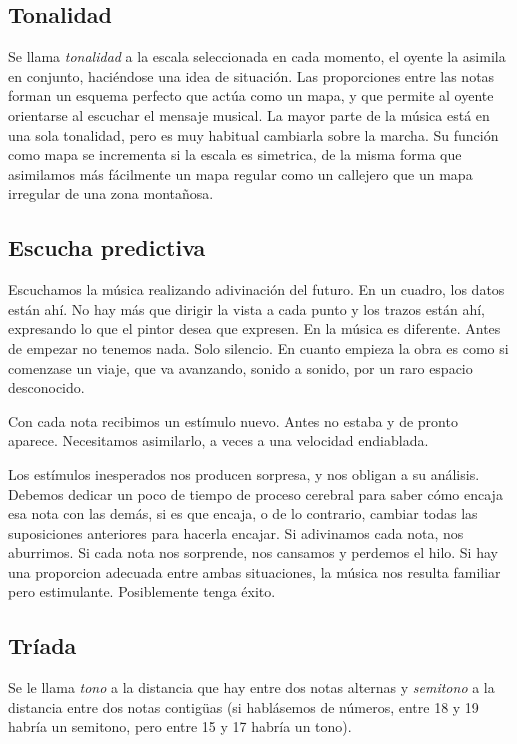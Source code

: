 \documentclass[]{report}
\begin{document}
\subsection{Tonalidad}

Se llama \emph{tonalidad} a la escala seleccionada en cada momento, el oyente la asimila en conjunto, haciéndose una idea de situación. Las proporciones entre las notas forman un esquema perfecto que actúa como un mapa, y que permite al oyente orientarse al escuchar el mensaje musical. La mayor parte de la música está en una sola tonalidad, pero es muy habitual cambiarla sobre la marcha. Su función como mapa se incrementa si la escala es simetrica, de la misma forma que asimilamos más fácilmente un mapa regular como un callejero que un mapa irregular de una zona montañosa.

\subsection{Escucha predictiva}

Escuchamos la música realizando adivinación del futuro. En un cuadro, los datos están ahí. No hay más que dirigir la vista a cada punto y los trazos están ahí, expresando lo que el pintor desea que expresen. En la música es diferente. Antes de empezar no tenemos nada. Solo silencio. En cuanto empieza la obra es como si comenzase un viaje, que va avanzando, sonido a sonido, por un raro espacio desconocido.

Con cada nota recibimos un estímulo nuevo. Antes no estaba y de pronto aparece. Necesitamos asimilarlo, a veces a una velocidad endiablada.

Los estímulos inesperados nos producen sorpresa, y nos obligan a su análisis. Debemos dedicar un poco de tiempo de proceso cerebral para saber cómo encaja esa nota con las demás, si es que encaja, o de lo contrario, cambiar todas las suposiciones anteriores para hacerla encajar. Si adivinamos cada nota, nos aburrimos. Si cada nota nos sorprende, nos cansamos y perdemos el hilo. Si hay una proporcion adecuada entre ambas situaciones, la música nos resulta familiar pero estimulante. Posiblemente tenga éxito.

\subsection{Tríada}

Se le llama \emph{tono} a la distancia que hay entre dos notas alternas y \emph{semitono} a la distancia entre dos notas contigüas (si hablásemos de números, entre 18 y 19 habría un semitono, pero entre 15 y 17 habría un tono).
\end{document}
